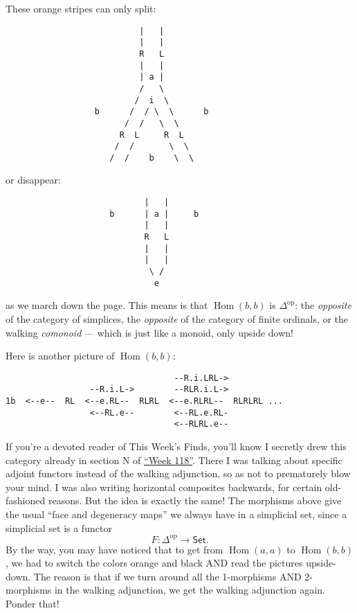 \documentclass{article}
\begin{document}
These orange stripes can only split:

\begin{verbatim}
                           |   |
                           |   |   
                           R   L
                           |   |
                           | a |
                           /   \                           
                          /  i  \
                  b      /  / \  \      b
                        /  /   \  \
                       R  L     R  L
                      /  /       \  \
                     /  /    b    \  \ 
\end{verbatim}

or disappear:

\begin{verbatim}
                            |   |    
                     b      | a |     b 
                            |   |
                            R   L   
                            |   |
                            |   |
                             \ /
                              e
\end{verbatim}

as we march down the page. This means is that
\(\operatorname{Hom}(b,b)\) is \(\Delta^{\mathrm{op}}\): the
\emph{opposite} of the category of simplices, the \emph{opposite} of the
category of finite ordinals, or the walking \emph{comonoid} --- which is
just like a monoid, only upside down!

Here is another picture of \(\operatorname{Hom}(b,b)\):

\begin{verbatim}
                                  --R.i.LRL->
                 --R.i.L->        --RLR.i.L->
1b  <--e--  RL  <--e.RL--  RLRL  <--e.RLRL--  RLRLRL ...
                 <--RL.e--        <--RL.e.RL-
                                  <--RLRL.e--
\end{verbatim}

If you're a devoted reader of This Week's Finds, you'll know I secretly
drew this category already in section N of
\protect\hyperlink{week118}{``Week 118''}. There I was talking about
specific adjoint functors instead of the walking adjunction, so as not
to prematurely blow your mind. I was also writing horizontal composites
backwards, for certain old-fashioned reasons. But the idea is exactly
the same! The morphisms above give the usual ``face and degeneracy
maps'' we always have in a simplicial set, since a simplicial set is a
functor \[F\colon \Delta^{\mathrm{op}} \to \mathsf{Set}.\] By the way,
you may have noticed that to get from \(\operatorname{Hom}(a,a)\) to
\(\operatorname{Hom}(b,b)\), we had to switch the colors orange and
black AND read the pictures upside-down. The reason is that if we turn
around all the 1-morphisms AND 2-morphisms in the walking adjunction, we
get the walking adjunction again. Ponder that!
\end{document}
